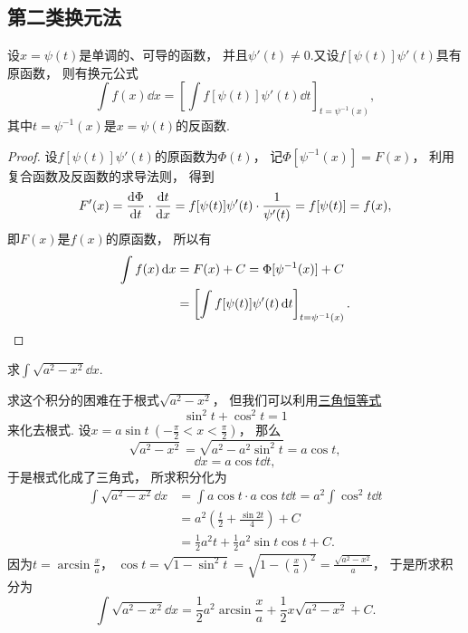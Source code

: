 \subsection{第二类换元法}
\begin{theorem}
设\(x = \psi(t)\)是单调的、可导的函数，
并且\(\psi'(t) \neq 0\).又设\(f[\psi(t)] \psi'(t)\)具有原函数，
则有换元公式\[
	\int f(x) \dd{x}
	= \left[ \int f[\psi(t)] \psi'(t) \dd{t} \right]_{t=\psi^{-1}(x)},
\]
其中\(t=\psi^{-1}(x)\)是\(x=\psi(t)\)的反函数.
\begin{proof}
设\(f[\psi(t)] \psi'(t)\)的原函数为\(\Phi(t)\)，
记\(\Phi[\psi^{-1}(x)] = F(x)\)，
利用复合函数及反函数的求导法则，
得到\[
	F'(x) = \dv{\Phi}{t} \cdot \dv{t}{x}
	= f[\psi(t)] \psi'(t) \cdot \frac{1}{\psi'(t)}
	= f[\psi(t)] = f(x),
\]
即\(F(x)\)是\(f(x)\)的原函数，
所以有\begin{align*}
	\int f(x) \dd{x} &= F(x) + C
	= \Phi[\psi^{-1}(x)] + C \\
	&= \left[ \int f[\psi(t)] \psi'(t) \dd{t} \right]_{t=\psi^{-1}(x)}.
	\qedhere
\end{align*}
\end{proof}
\end{theorem}

\begin{example}
求\(\int \sqrt{a^2 - x^2} \dd{x}\).
\begin{solution}
求这个积分的困难在于根式\(\sqrt{a^2-x^2}\)，
但我们可以利用\hyperref[equation:三角函数.毕达哥拉斯三角恒等式1]{三角恒等式}\[
	\sin^2 t + \cos^2 t = 1
\]来化去根式.
设\(x = a \sin t\ (-\frac\pi2 < x < \frac\pi2)\)，
那么\[
	\sqrt{a^2 - x^2}
	= \sqrt{a^2 - a^2 \sin^2 t}
	= a \cos t,
\]\[
	\dd{x}
	= a \cos t \dd{t},
\]
于是根式化成了三角式，
所求积分化为\begin{align*}
	\int \sqrt{a^2 - x^2} \dd{x}
	&= \int a \cos t \cdot a \cos t \dd{t}
	= a^2 \int \cos^2 t \dd{t} \\
	&= a^2 \left( \frac{t}{2} + \frac{\sin 2t}{4} \right) + C \\
	&= \frac{1}{2} a^2 t + \frac{1}{2} a^2 \sin t \cos t + C.
\end{align*}
因为\(t = \arcsin\frac{x}{a}\)，
\(\cos t
= \sqrt{1-\sin^2 t}
= \sqrt{1-\left(\frac{x}{a}\right)^2}
= \frac{\sqrt{a^2-x^2}}{a}\)，
于是所求积分为\[
	\int \sqrt{a^2 - x^2} \dd{x}
	= \frac{1}{2} a^2 \arcsin\frac{x}{a} + \frac{1}{2} x \sqrt{a^2 - x^2} + C.
\]
\end{solution}
\end{example}

